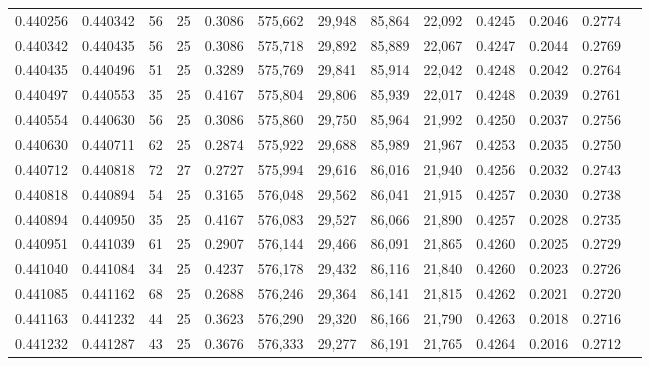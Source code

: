 \begin{tabular}{rrrrrrrrrrrrr}
0.440256 & 0.440342 &    56 &  25 &                                     0.3086 & 575,662 &  29,948 &  85,864 &  22,092 & 0.4245 & 0.2046 & 0.2774 \\
0.440342 & 0.440435 &    56 &  25 &                                     0.3086 & 575,718 &  29,892 &  85,889 &  22,067 & 0.4247 & 0.2044 & 0.2769 \\
0.440435 & 0.440496 &    51 &  25 &                                     0.3289 & 575,769 &  29,841 &  85,914 &  22,042 & 0.4248 & 0.2042 & 0.2764 \\
0.440497 & 0.440553 &    35 &  25 &                                     0.4167 & 575,804 &  29,806 &  85,939 &  22,017 & 0.4248 & 0.2039 & 0.2761 \\
0.440554 & 0.440630 &    56 &  25 &                                     0.3086 & 575,860 &  29,750 &  85,964 &  21,992 & 0.4250 & 0.2037 & 0.2756 \\
0.440630 & 0.440711 &    62 &  25 &                                     0.2874 & 575,922 &  29,688 &  85,989 &  21,967 & 0.4253 & 0.2035 & 0.2750 \\
0.440712 & 0.440818 &    72 &  27 &                                     0.2727 & 575,994 &  29,616 &  86,016 &  21,940 & 0.4256 & 0.2032 & 0.2743 \\
0.440818 & 0.440894 &    54 &  25 &                                     0.3165 & 576,048 &  29,562 &  86,041 &  21,915 & 0.4257 & 0.2030 & 0.2738 \\
0.440894 & 0.440950 &    35 &  25 &                                     0.4167 & 576,083 &  29,527 &  86,066 &  21,890 & 0.4257 & 0.2028 & 0.2735 \\
0.440951 & 0.441039 &    61 &  25 &                                     0.2907 & 576,144 &  29,466 &  86,091 &  21,865 & 0.4260 & 0.2025 & 0.2729 \\
0.441040 & 0.441084 &    34 &  25 &                                     0.4237 & 576,178 &  29,432 &  86,116 &  21,840 & 0.4260 & 0.2023 & 0.2726 \\
0.441085 & 0.441162 &    68 &  25 &                                     0.2688 & 576,246 &  29,364 &  86,141 &  21,815 & 0.4262 & 0.2021 & 0.2720 \\
0.441163 & 0.441232 &    44 &  25 &                                     0.3623 & 576,290 &  29,320 &  86,166 &  21,790 & 0.4263 & 0.2018 & 0.2716 \\
0.441232 & 0.441287 &    43 &  25 &                                     0.3676 & 576,333 &  29,277 &  86,191 &  21,765 & 0.4264 & 0.2016 & 0.2712 \\

\end{tabular}
